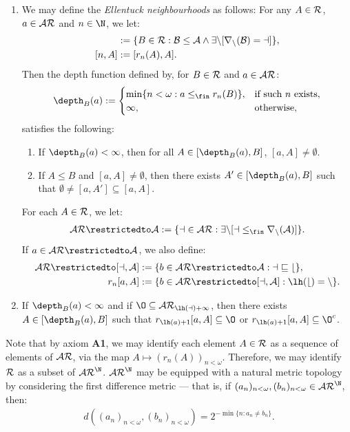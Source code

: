 \documentclass[11pt,reqno]{amsart}
\begin{document}
\begin{enumerate}
    \item[\textbf{(A3)}] We may define the \emph{Ellentuck neighbourhoods} as follows: For any $A \in \cal{R}$, $a \in \cal{AR}$ and $n \in \N$, we let:
    \begin{align*}
        [a,A] &:= \{B \in \cal{R} : B \leq A \wedge \exists n[r_n(B) = a]\}, \\
        [n,A] &:= [r_n(A),A].
    \end{align*}
    Then the depth function defined by, for $B \in \cal{R}$ and $a \in \cal{AR}$:
    \begin{align*}
        \depth_B(a) := 
        \begin{cases}
            \min\{n < \omega : a \leq_\fin r_n(B)\}, &\text{if such $n$ exists}, \\
            \infty, &\text{otherwise},
        \end{cases}
    \end{align*}
    satisfies the following:
    \begin{enumerate}[label=(\arabic*)]
        \item If $\depth_B(a) < \infty$, then for all $A \in [\depth_B(a),B]$, $[a,A] \neq \emptyset$.

        \item If $A \leq B$ and $[a,A] \neq \emptyset$, then there exists $A' \in [\depth_B(a),B]$ such that $\emptyset \neq [a,A'] \subseteq [a,A]$.
    \end{enumerate}
    For each $A \in \cal{R}$, we let:
    \begin{align*}
        \cal{AR}\restrictedto A := \{a \in \cal{AR} : \exists n[a \leq_\fin r_n(A)]\}.
    \end{align*}
    If $a \in \cal{AR}\restrictedto A$, we also define:
    \begin{align*}
        \cal{AR}\restrictedto[a,A] &:= \{b \in \cal{AR}\restrictedto A : a \sqsubseteq b\}, \\
        r_n[a,A] &:= \{b \in \cal{AR}\restrictedto[a,A] : \lh(b) = n\}.
    \end{align*}

    \item[\textbf{(A4)}] If $\depth_B(a) < \infty$ and if $\O \subseteq \cal{AR}_{\lh(a)+1}$, then there exists $A \in [\depth_B(a),B]$ such that $r_{\lh(a)+1}[a,A] \subseteq \O$ or $r_{\lh(a)+1}[a,A] \subseteq \O^c$.
\end{enumerate}

Note that by axiom \textbf{A1}, we may identify each element $A \in \cal{R}$ as a sequence of elements of $\cal{AR}$, via the map $A \mapsto (r_n(A))_{n<\omega}$. Therefore, we may identify $\cal{R}$ as a subset of $\cal{AR}^\N$. $\cal{AR}^\N$ may be equipped with a natural metric topology by considering the first difference metric --- that is, if $(a_n)_{n<\omega},(b_n)_{n<\omega} \in \cal{AR}^\N$, then:
\begin{align*}
    d((a_n)_{n<\omega},(b_n)_{n<\omega}) = 2^{-\min\{n : a_n \neq b_n\}}.
\end{align*}
\end{document}
